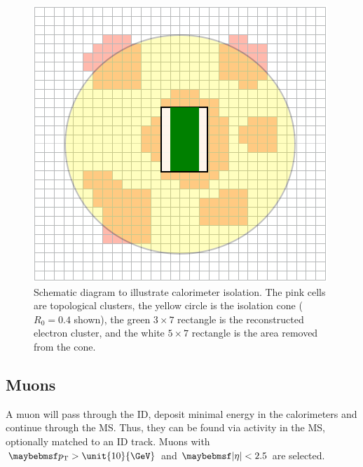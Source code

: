 \begin{figure}
	\includegraphics[width=\smallfigwidth]{tex/selection/el_isolation}
	\caption{Schematic diagram to illustrate calorimeter isolation. The pink cells are 
	topological clusters, the yellow circle is the isolation cone ($R_0 = 0.4$ shown), 
	the green $3 \times 7$ rectangle is the reconstructed electron cluster, and the white 
	$5 \times 7$ rectangle is the area removed from the cone.}
	\label{fig:objects:el_iso}
\end{figure}



\subsection{Muons}
\label{sec:objects:muons}

A muon will pass through the \ac{ID}, deposit minimal energy in the calorimeters and 
continue through the \ac{MS}. Thus, they can be found via activity in the \ac{MS}, 
optionally matched to an \ac{ID} track. Muons with $\pt > \unit{10}{\GeV}$ and 
$\mods{\eta} < 2.5$ are selected.

